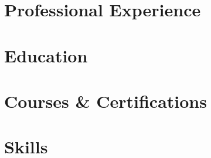 \documentclass[10pt,a4paper]{article}
\begin{document}




\section*{Professional Experience}
\vspace{-0.5em}


\vspace{-0.5em}
\section*{Education}
\vspace{-0.5em}


\vspace{-0.5em}
\section*{Courses \& Certifications}
\vspace{-0.5em}


\vspace{-0.5em}
\section*{Skills}
\vspace{-0.5em}


\vspace{-0.5em}

\end{document}
